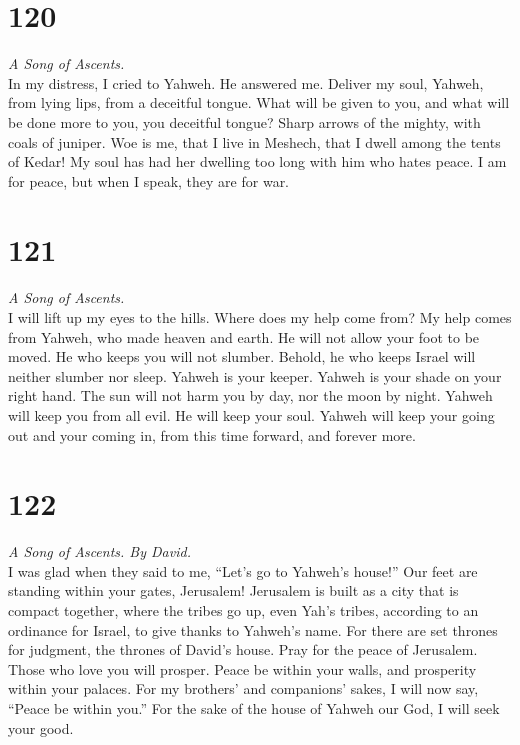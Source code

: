 \hypertarget{section-119}{%
\section{120}\label{section-119}}

\emph{A Song of Ascents.}\\
 In my distress, I cried to Yahweh. He answered me.
 Deliver my soul, Yahweh, from lying lips, from a
deceitful tongue.  What will be given to you, and what
will be done more to you, you deceitful tongue?  Sharp
arrows of the mighty, with coals of juniper.  Woe is me,
that I live in Meshech, that I dwell among the tents of Kedar!
 My soul has had her dwelling too long with him who hates
peace.  I am for peace, but when I speak, they are for
war.

\hypertarget{section-120}{%
\section{121}\label{section-120}}

\emph{A Song of Ascents.}\\
 I will lift up my eyes to the hills. Where does my help
come from?  My help comes from Yahweh, who made heaven and
earth.  He will not allow your foot to be moved. He who
keeps you will not slumber.  Behold, he who keeps Israel
will neither slumber nor sleep.  Yahweh is your keeper.
Yahweh is your shade on your right hand.  The sun will not
harm you by day, nor the moon by night.  Yahweh will keep
you from all evil. He will keep your soul.  Yahweh will
keep your going out and your coming in, from this time forward, and
forever more.

\hypertarget{section-121}{%
\section{122}\label{section-121}}

\emph{A Song of Ascents. By David.}\\
 I was glad when they said to me, ``Let's go to Yahweh's
house!''  Our feet are standing within your gates,
Jerusalem!  Jerusalem is built as a city that is compact
together,  where the tribes go up, even Yah's tribes,
according to an ordinance for Israel, to give thanks to Yahweh's name.
 For there are set thrones for judgment, the thrones of
David's house.  Pray for the peace of Jerusalem. Those who
love you will prosper.  Peace be within your walls, and
prosperity within your palaces.  For my brothers' and
companions' sakes, I will now say, ``Peace be within you.''
 For the sake of the house of Yahweh our God, I will seek
your good.

